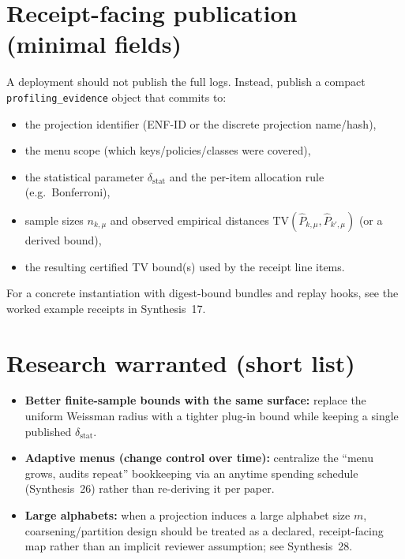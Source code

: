 \documentclass[11pt]{article}
\newcommand{\TV}{\mathrm{TV}}
\begin{document}
\section{Receipt-facing publication (minimal fields)}
A deployment should not publish the full logs.
Instead, publish a compact \texttt{profiling\_evidence} object that commits to:
\begin{itemize}[leftmargin=*]
\item the projection identifier (ENF-ID or the discrete projection name/hash),
\item the menu scope (which keys/policies/classes were covered),
\item the statistical parameter $\delta_{\mathrm{stat}}$ and the per-item allocation rule (e.g.\ Bonferroni),
\item sample sizes $n_{k,\mu}$ and observed empirical distances $\TV(\widehat P_{k,\mu},\widehat P_{k',\mu})$ (or a derived bound),
\item the resulting certified TV bound(s) used by the receipt line items. \cite{series:receiptitems}
\end{itemize}
For a concrete instantiation with digest-bound bundles and replay hooks, see the worked example receipts in Synthesis~17. \cite{series:workedexample}

\section{Research warranted (short list)}
\begin{itemize}[leftmargin=*]
\item \textbf{Better finite-sample bounds with the same surface:} replace the uniform Weissman radius with a tighter plug-in bound while keeping a single published $\delta_{\mathrm{stat}}$.
\item \textbf{Adaptive menus (change control over time):} centralize the ``menu grows, audits repeat'' bookkeeping via an anytime spending schedule (Synthesis~26) rather than re-deriving it per paper.\cite{series:anytimespend}
\item \textbf{Large alphabets:} when a projection induces a large alphabet size $m$, coarsening/partition design should be treated as a declared, receipt-facing map rather than an implicit reviewer assumption; see Synthesis~28.\cite{series:coarsening}
\end{itemize}
\end{document}

